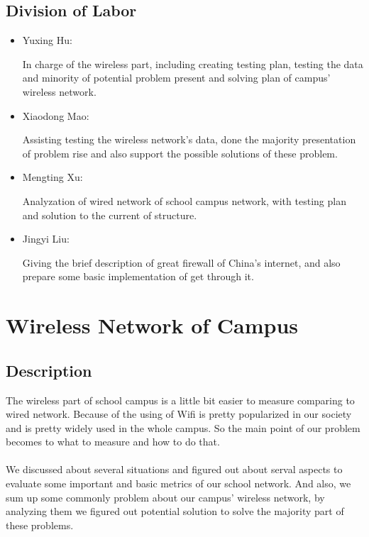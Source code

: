 \documentclass[paper=a4, fontsize=11pt]{scrartcl}
\numberwithin{equation}{section}
\numberwithin{figure}{section}
\numberwithin{table}{section}
\begin{document}
\subsection{Division of Labor}
\begin{itemize}
\item Yuxing Hu: 
\par In charge of the wireless part, including creating testing plan, testing the data and minority of potential problem present and solving plan of campus' wireless network.
\item Xiaodong Mao: 
\par Assisting testing the wireless network's data, done the majority presentation of problem rise and also support the possible solutions of these problem.
\item Mengting Xu: 
\par Analyzation of wired network of school campus network, with testing plan and solution to the current of structure.
\item Jingyi Liu: 
\par Giving the brief description of great firewall of China's internet, and also prepare some basic implementation of get through it.
\end{itemize}
\section{Wireless Network of Campus}
\subsection{Description}
The wireless part of school campus is a little bit easier to measure comparing to wired network. Because of the using of Wifi is pretty popularized in our society and is pretty widely used in the whole campus. So the main point of our problem becomes to what to measure and how to do that. 
\paragraph{}
We discussed about several situations and figured out about serval aspects to evaluate some important and basic metrics of our school network. And also, we sum up some commonly problem about our campus' wireless network, by analyzing them we figured out potential solution to solve the majority part of these problems.
\end{document}
